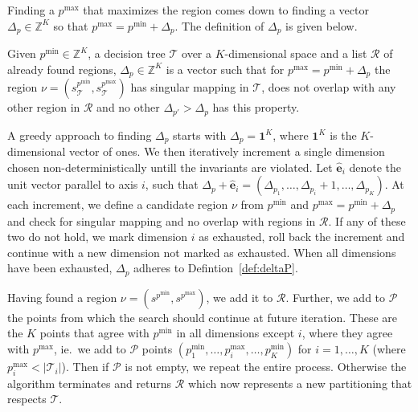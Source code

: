 Finding a $p^{\max}$ that maximizes the region comes down to finding a vector
$\Delta_{p} \in \mathbb{Z}^{K}$ so that $p^{\max} = p^{\min} + \Delta_{p}$. The
definition of $\Delta_{p}$ is given below.

\begin{definition}
    Given $p^{\min} \in \mathbb{Z}^{K}$, a decision tree $\mathcal{T}$ over a
    $K$-dimensional space and a list $\mathcal{R}$ of already found regions,
    $\Delta_{p} \in \mathbb{Z}^{K}$ is a vector such that for $p^{\max} =
    p^{\min} + \Delta_{p}$ the region $\nu = (s^{p^{\min}}_{\mathcal{T}},
    s^{p^{\max}}_{\mathcal{T}})$ has singular mapping in $\mathcal{T}$, does not
    overlap with any other region in $\mathcal{R}$ and no other $\Delta_{p'} >
    \Delta_{p}$ has this property.
\end{definition}\label{def:deltaP}

A greedy approach to finding $\Delta_{p}$ starts with $\Delta_{p} =
\mathbf{1}^{K}$, where $\mathbf{1}^{K}$ is the $K$-dimensional vector of ones.
We then iteratively increment a single dimension chosen non-deterministically
untill the invariants are violated.  Let $\mathbf{\hat{e}}_i$ denote the unit
vector parallel to axis $i$, such that $\Delta_{p} + \mathbf{\hat{e}}_i =
(\Delta_{p_1},\ldots,\Delta_{p_i} + 1,\ldots,\Delta_{p_K})$. At each increment,
we define a candidate region $\nu$ from $p^{\min}$ and $p^{\max} = p^{\min} +
\Delta_{p}$ and check for singular mapping and no overlap with regions in
$\mathcal{R}$. If any of these two do not hold, we mark dimension $i$ as
exhausted, roll back the increment and continue with a new dimension not marked
as exhausted. When all dimensions have been exhausted, $\Delta_{p}$ adheres to
Defintion~\ref{def:deltaP}.

Having found a region $\nu = (s^{p^{\min}}, s^{p^{\max}})$, we add it to
$\mathcal{R}$. Further, we add to $\mathcal{P}$ the points from which the search
should continue at future iteration. These are the $K$ points that agree with
$p^{\min}$ in all dimensions except $i$, where they agree with $p^{\max}$, ie.\
we add to $\mathcal{P}$ points $(p^{\min}_{1}, \ldots, p^{\max}_{i}, \ldots,
p^{\min}_{K})$ for $i = 1,\ldots,K$ (where $p^{\max}_{i} < |\mathcal{T}_{i}|$).
Then if $\mathcal{P}$ is not empty, we repeat the entire process. Otherwise the
algorithm terminates and returns $\mathcal{R}$ which now represents a new
partitioning that respects $\mathcal{T}$.

